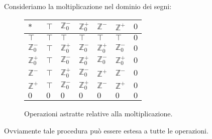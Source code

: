Consideriamo la moltiplicazione nel dominio dei segni:
\begin{figure}[H]
    \centering
    \renewcommand{\arraystretch}{2}
    \begin{tabular}{m{2em}|m{2em}m{2em}m{2em}m{2em}m{2em}m{2em}}
        
        $*$ & $\top$ & $\mathbb{Z}^-_0$ & $\mathbb{Z}^+_0$ & $\mathbb{Z}^-$ & $\mathbb{Z}^+ $ & $0$ \\
        \hline
        $\top$ & $\top$ & $\top$ & $\top$ & $\top$ & $\top$ & $0$ \\

        $\mathbb{Z}^-_0$ & $\top$ & $\mathbb{Z}^+_0$ & $\mathbb{Z}^-_0$ & $\mathbb{Z}^+_0$ & $\mathbb{Z}^-_0$ & $0$ \\

        $\mathbb{Z}^+_0$ & $\top$ & $\mathbb{Z}^-_0$ & $\mathbb{Z}^+_0$ & $\mathbb{Z}^-_0$ & $\mathbb{Z}^+_0$ & $0$ \\

        $\mathbb{Z}^-$ & $\top$ & $\mathbb{Z}^+_0$ & $\mathbb{Z}^-_0$ & $\mathbb{Z}^+$ & $\mathbb{Z}^-$ & $0$ \\

        $\mathbb{Z}^+$ & $\top$ & $\mathbb{Z}^-_0$ & $\mathbb{Z}^+_0$ & $\mathbb{Z}^-$ & $\mathbb{Z}^+$ & $0$ \\

        $0$ & $0$ & $0$ & $0$ & $0$ & $0$ & $0$ \\
      \end{tabular}
      \caption{Operazioni astratte relative alla moltiplicazione.}
    \end{figure}
Ovviamente tale procedura può essere estesa a tutte le operazioni.

